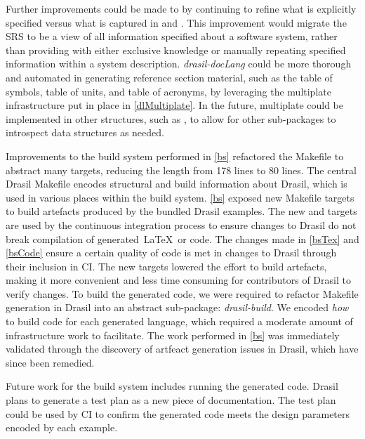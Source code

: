 Further improvements could be made to  by continuing to refine what is explicitly specified versus what is captured in  and . This improvement would migrate the SRS to be a view of all information specified about a software system, rather than providing  with either exclusive knowledge or manually repeating specified information within a system description. \textit{drasil-docLang} could be more thorough and automated in generating reference section material, such as the table of symbols, table of units, and table of acronyms, by leveraging the multiplate infrastructure put in place in \autoref{dlMultiplate}. In the future, multiplate could be implemented in other structures, such as , to allow for other sub-packages to introspect data structures as needed. 

Improvements to the build system performed in \autoref{bs} refactored the Makefile to abstract many targets, reducing the length from 178 lines to 80 lines. The central Drasil Makefile encodes structural and build information about Drasil, which is used in various places within the build system. \autoref{bs} exposed new Makefile targets to build artefacts produced by the bundled Drasil examples. The new  and  targets are used by the continuous integration process to ensure changes to Drasil do not break compilation of generated\ \LaTeX\ or code. The changes made in \autoref{bsTex} and \autoref{bsCode} ensure a certain quality of code is met in changes to Drasil through their inclusion in CI. The new targets lowered the effort to build artefacts, making it more convenient and less time consuming for contributors of Drasil to verify changes. To build the generated code, we were required to refactor Makefile generation in Drasil into an abstract sub-package: \textit{drasil-build}. We encoded \textit{how} to build code for each generated language, which required a moderate amount of infrastructure work to facilitate. The work performed in \autoref{bs} was immediately validated through the discovery of artfeact generation issues in Drasil, which have since been remedied.

Future work for the build system includes running the generated code. Drasil plans to generate a test plan as a new piece of documentation. The test plan could be used by CI to confirm the generated code meets the design parameters encoded by each example. 

